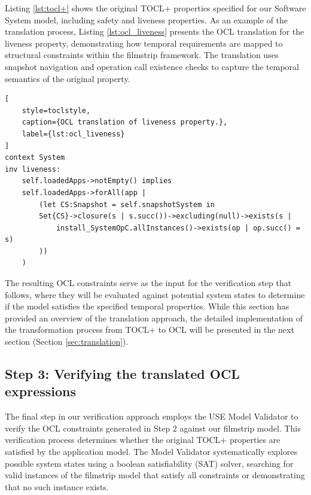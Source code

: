Listing \ref{lst:tocl+} shows the original TOCL+ properties specified for our 
Software System model, including safety and liveness properties. As an example of 
the translation process, Listing \ref{lst:ocl_liveness} presents the OCL translation 
for the liveness property, demonstrating how temporal requirements are mapped to 
structural constraints within the filmstrip framework. The translation uses snapshot 
navigation and operation call existence checks to capture the temporal semantics of 
the original property.

\begin{lstlisting}[
    style=toclstyle, 
    caption={OCL translation of liveness property.}, 
    label={lst:ocl_liveness}
]
context System
inv liveness:
    self.loadedApps->notEmpty() implies
    self.loadedApps->forAll(app |
        (let CS:Snapshot = self.snapshotSystem in 
        Set{CS}->closure(s | s.succ())->excluding(null)->exists(s | 
            install_SystemOpC.allInstances()->exists(op | op.succ() = s)
        ))
    )
\end{lstlisting}

The resulting OCL constraints serve as the input for the verification step that 
follows, where they will be evaluated against potential system states to determine 
if the model satisfies the specified temporal properties. While this section has 
provided an overview of the translation approach, the detailed implementation 
of the transformation process from TOCL+ to OCL will be presented in the next section
(Section \ref{sec:translation}).


\subsection{Step 3: Verifying the translated OCL expressions}

\hspace{1cm} The final step in our verification approach employs the USE Model 
Validator \cite{USE_Validator} to verify the OCL constraints generated in Step 2 
against our filmstrip model. This verification process determines whether the 
original TOCL+ properties are satisfied by the application model. The Model Validator 
systematically explores possible system states using a boolean satisfiability (SAT) 
solver, searching for valid instances of the filmstrip model that satisfy all 
constraints or demonstrating that no such instance exists.

